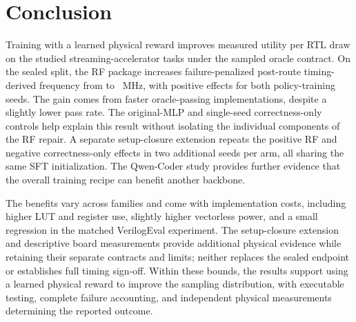 \section{Conclusion}
\label{sec:conclusion}

Training with a learned physical reward improves measured utility per RTL
draw on the studied streaming-accelerator tasks under the sampled oracle
contract. On the sealed split, the RF package increases failure-penalized
post-route timing-derived frequency from
 to
~MHz, with positive effects for both
policy-training seeds. The gain comes from faster oracle-passing
implementations, despite a slightly lower pass rate. The original-MLP and
single-seed correctness-only controls help explain this result without
isolating the individual components of the RF repair. A separate setup-closure
extension repeats the positive RF and negative correctness-only effects in
two additional seeds per arm, all sharing the same SFT initialization. The
Qwen-Coder study provides further evidence that the overall training recipe
can benefit another backbone.

The benefits vary across families and come with implementation costs,
including higher LUT and register use, slightly higher vectorless power, and
a small regression in the matched VerilogEval experiment. The setup-closure
extension and descriptive board measurements provide additional physical
evidence while retaining their separate contracts and limits; neither replaces
the sealed endpoint or establishes full timing sign-off. Within these bounds,
the results support using a learned physical reward to improve the sampling
distribution, with executable testing, complete failure accounting, and
independent physical measurements determining the reported outcome.
